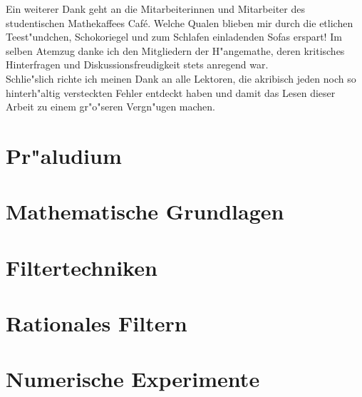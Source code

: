 \documentclass[11pt, twoside]{report} %
\begin{document}
Ein weiterer Dank geht an die Mitarbeiterinnen und Mitarbeiter des studentischen Mathekaffees  Caf\'e\grqq. Welche Qualen blieben mir durch
die etlichen Teest"undchen, Schokoriegel und zum Schlafen einladenden Sofas erspart! Im selben Atemzug
danke ich den Mitgliedern der \glqq H"angemathe\grqq, deren kritisches Hinterfragen und Diskussionsfreudigkeit stets anregend war.\\

Schlie"slich richte ich meinen Dank an alle Lektoren, die akribisch jeden noch so hinterh"altig versteckten
Fehler entdeckt haben und damit das Lesen dieser Arbeit zu einem gr"o"seren Vergn"ugen machen.\\

\tableofcontents

\chapter{Pr"aludium}%


\chapter{Mathematische Grundlagen}
\label{chap2}

\chapter{Filtertechniken} %


\chapter{Rationales Filtern}%


\chapter{Numerische Experimente}

\end{document}
